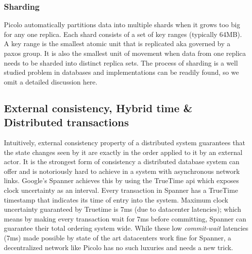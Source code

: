 \subsubsection{Sharding}
\textsf{Picolo} automatically partitions data into multiple shards when it grows too big for any one replica. Each shard consists of a set of key ranges (typically 64MB). A \textsf{key range} is the smallest atomic unit that is replicated aka governed by a paxos group. It is also the smallest unit of movement when data from one replica needs to be sharded into distinct replica sets. The process of sharding is a well studied problem in databases and implementations can be readily found, so we omit a detailed discussion here. 

\subsection{External consistency, Hybrid time \& Distributed transactions} \label{sec:hybrid_time}
Intuitively, external consistency property \cite{External_Consistency} of a distributed system guarantees that the state changes seen by it are exactly in the order applied to it by an external actor. It is the strongest form of consistency a distributed database system can offer and is notoriously hard to achieve in a system with asynchronous network links. Google's Spanner \cite{spanner} achieves this by using the TrueTime api which exposes clock uncertainty as an interval. Every transaction in Spanner has a TrueTime timestamp that indicates its time of entry into the system. Maximum clock uncertainty guaranteed by Truetime is 7ms (due to datacenter latencies); which means by making every transaction wait for 7ms before committing, Spanner can guarantee their total ordering system wide. While these low \textit{commit-wait} latencies (7ms) made possible by state of the art datacenters work fine for Spanner, a decentralized network like \textsf{Picolo} has no such luxuries and needs a new trick.
